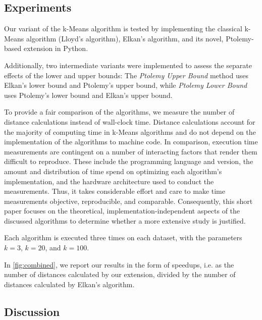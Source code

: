 \subsection{Experiments}
Our variant of the k-Means algorithm is tested by implementing the classical k-Means algorithm (Lloyd's algorithm), Elkan's algorithm, and its novel, Ptolemy-based extension in Python.

Additionally, two intermediate variants were implemented to assess the separate effects of the lower and upper bounds:
The \emph{Ptolemy Upper Bound} method uses Elkan's lower bound and Ptolemy's upper bound, while \emph{Ptolemy Lower Bound} uses Ptolemy's lower bound and Elkan's upper bound.

To provide a fair comparison of the algorithms,
we measure the number of distance calculations instead of wall-clock time.
Distance calculations account for the majority of computing time in k-Means algorithms and do not depend on the implementation of the algorithms to machine code.
In comparison, execution time measurements are contingent on a number of interacting factors that render them difficult to reproduce.
These include the programming language and version, the amount and distribution of time spend on optimizing each algorithm's implementation, and the hardware architecture used to conduct the measurements.
Thus, it takes considerable effort and care to make time measurements objective, reproducible, and comparable.
Consequently, this short paper focuses on the theoretical, implementation-independent aspects of the discussed algorithms to determine whether a more extensive study is justified.


Each algorithm is executed three times on each dataset, with the parameters $k = 3$, $k = 20$, and $k = 100$.

In \autoref{fig:combined},
we report our results in the form of speedups,
i.e. as the number of distances calculated by our extension,
divided by the number of distances calculated by Elkan's algorithm.



\subsection{Discussion}

